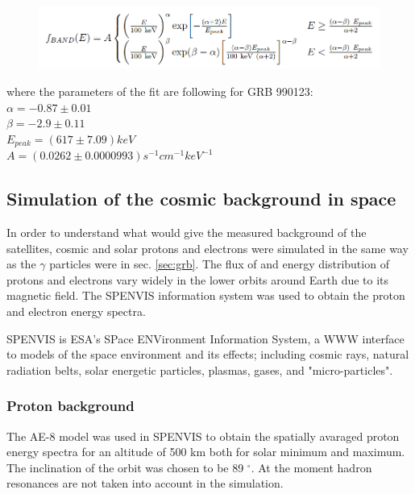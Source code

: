 \documentclass[12pt, a4paper,titlepage]{article}
\numberwithin{equation}{section}
\numberwithin{figure}{section}
\begin{document}
\begin{figure}[h!]
\begin{center}
\includegraphics[width=130.0mm]{images/band_function.png}
\label{eq:bandfunc}
\end{center}
\end{figure}

where the parameters of the fit are following for GRB 990123:\\
$\alpha = -0.87 \pm 0.01 $\\
$\beta = -2.9 \pm 0.11$\\
$E_{peak} = (617 \pm 7.09) keV$\\
$A= (0.0262 \pm 0.0000993) s^{-1}cm^{-1}keV^{-1}$\\


\subsection{Simulation of the cosmic background in space}

In order to understand what would give the measured background of the satellites, cosmic and solar protons and electrons were simulated in the same way as the $\gamma$ particles were in sec. \ref{sec:grb}. The flux of and energy distribution of protons and electrons vary widely in the lower orbits around Earth due to its magnetic field. The SPENVIS \cite{spenvis} information system was used to obtain the proton and electron energy spectra.

SPENVIS is ESA's SPace ENVironment Information System, a WWW interface to models of the space environment and its effects; including cosmic rays, natural radiation belts, solar energetic particles, plasmas, gases, and "micro-particles".

\subsubsection{Proton background}

The AE-8 model was used in SPENVIS to obtain the spatially avaraged proton energy spectra for an altitude of 500 km both for solar minimum and maximum. The inclination of the orbit was chosen to be 89 $^{\circ}$. At the moment hadron resonances are not taken into account in the simulation.
\end{document}
